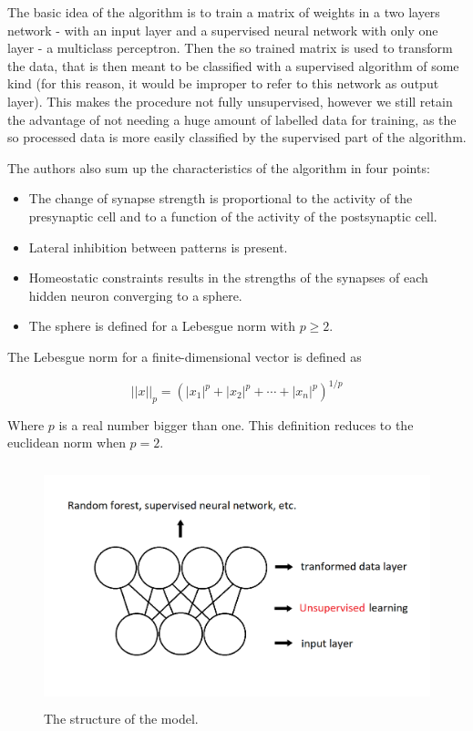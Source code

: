 \documentclass[a4paper]{report}
\begin{document}
The basic idea of the algorithm is to train a matrix of weights in a two layers network - with an input layer and a supervised neural network with only one layer - a multiclass perceptron.
Then the so trained matrix is used to transform the data, that is then meant to be classified with a supervised algorithm of some kind (for this reason, it would be improper to refer to this network as output layer).
This makes the procedure not fully unsupervised, however we still retain the advantage of not needing a huge amount of labelled data for training, as the so processed data is more easily classified by the supervised part of the algorithm.

The authors also sum up the characteristics of the algorithm  in four points:
\begin{itemize}
	\item The change of synapse strength is proportional to the activity of the presynaptic cell and to a function of the activity of the postsynaptic cell.
	\item Lateral inhibition between patterns is present.
	\item Homeostatic constraints results in the strengths of the synapses of each hidden neuron converging to a sphere.
	\item The sphere is defined for a Lebesgue norm with $p \geq 2$.
\end{itemize}

The Lebesgue norm for a finite-dimensional vector is defined as

\begin{equation}
	||x||_p = (|x_1|^p+|x_2|^p+\cdots +|x_n|^p)^{1/p}
\end{equation}

Where $p$ is a real number bigger than one.
This definition reduces to the euclidean norm when $p=2$.

\begin{figure} [H]
\centering
\includegraphics [height=7cm ,width=12cm ] {o/2parti2.png}
\caption{The structure of the model.}
\end{figure}
\end{document}
